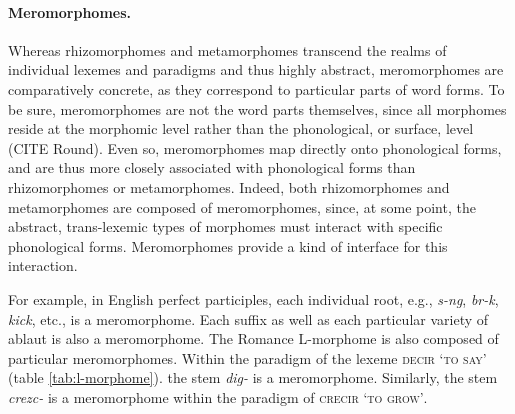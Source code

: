 \paragraph{Meromorphomes.} Whereas rhizomorphomes and metamorphomes transcend the realms of individual lexemes and paradigms and thus highly abstract, meromorphomes are comparatively concrete, as they correspond to particular parts of word forms. To be sure, meromorphomes are not the word parts themselves, since all morphomes reside at the morphomic level rather than the phonological, or surface, level (CITE Round). Even so, meromorphomes map directly onto phonological forms, and are thus more closely associated with phonological forms than rhizomorphomes or metamorphomes. Indeed, both rhizomorphomes and metamorphomes are composed of meromorphomes, since, at some point, the abstract, trans-lexemic types of morphomes must interact with specific phonological forms. Meromorphomes provide a kind of interface for this interaction.

For example, in English perfect participles, each individual root, e.g., \textit{s-ng}, \textit{br-k}, \textit{kick}, etc., is a meromorphome. Each suffix as well as each particular variety of ablaut is also a meromorphome. 
The Romance L-morphome is also composed of particular meromorphomes. Within the paradigm of the lexeme 
\textsc{decir} \textsc{`to say'} (table \ref{tab:l-morphome}).
the stem \textit{dig-} is a meromorphome. Similarly, the stem \textit{crezc-} 
is a meromorphome within the paradigm of 
\textsc{crecir} \textsc{`to grow'}. %

\begin{table}[ht]
\begin{center}
\label{tab:fusion}
\caption{Fusional suffixes in Hebrew nominals}
\end{center}
\end{table}


